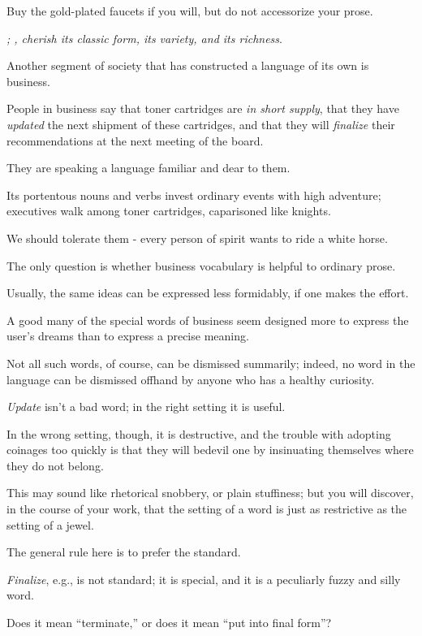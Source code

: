 \documentclass{book}
\numberwithin{equation}{section}
\begin{document}
Buy the gold-plated faucets if you will, but do not accessorize your prose.

\textit{; , cherish its classic form, its variety, and its richness}.

%
Another segment of society that has constructed a language of its own is business.

People in business say that toner cartridges are \textit{in short supply}, that they have \textit{updated} the next shipment of these cartridges, and that they will \textit{finalize} their recommendations at the next meeting of the board.

They are speaking a language familiar and dear to them.

Its portentous nouns and verbs invest ordinary events with high adventure; executives walk among toner cartridges, caparisoned like knights.

We should tolerate them - every person of spirit wants to ride a white horse.

The only question is whether business vocabulary is helpful to ordinary prose.

Usually, the same ideas can be expressed less formidably, if one makes the effort.

A good many of the special words of business seem designed more to express the user's dreams than to express a precise meaning.

Not all such words, of course, can be dismissed summarily; indeed, no word in the language can be dismissed offhand by anyone who has a healthy curiosity.

\textit{Update} isn't a bad word; in the right setting it is useful.

In the wrong setting, though, it is destructive, and the trouble with adopting coinages too quickly is that they will bedevil one by insinuating themselves where they do not belong.

This may sound like rhetorical snobbery, or plain stuffiness; but you will discover, in the course of your work, that the setting of a word is just as restrictive as the setting of a jewel.

The general rule here is to prefer the standard.

\textit{Finalize}, e.g., is not standard; it is special, and it is a peculiarly fuzzy and silly word.

Does it mean ``terminate,'' or does it mean ``put into final form''?
\end{document}
